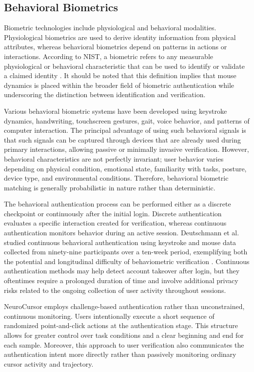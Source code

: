 \documentclass[conference]{IEEEtran}
\begin{document}
\subsection{Behavioral Biometrics}

Biometric technologies include physiological and behavioral modalities. Physiological biometrics are used to derive identity information from physical attributes, whereas behavioral biometrics depend on patterns in actions or interactions. According to NIST, a biometric refers to any measurable physiological or behavioral characteristic that can be used to identify or validate a claimed identity \cite{nistBiometrics}. It should be noted that this definition implies that mouse dynamics is placed within the broader field of biometric authentication while underscoring the distinction between identification and verification. 

Various behavioral biometric systems have been developed using keystroke dynamics, handwriting, touchscreen gestures, gait, voice behavior, and patterns of computer interaction. The principal advantage of using such behavioral signals is that such signals can be captured through devices that are already used during primary interactions, allowing passive or minimally invasive verification. However, behavioral characteristics are not perfectly invariant; user behavior varies depending on physical condition, emotional state, familiarity with tasks, posture, device type, and environmental conditions. Therefore, behavioral biometric matching is generally probabilistic in nature rather than deterministic. 

The behavioral authentication process can be performed either as a discrete checkpoint or continuously after the initial login. Discrete authentication evaluates a specific interaction created for verification, whereas continuous authentication monitors behavior during an active session. Deutschmann et al. studied continuous behavioral authentication using keystroke and mouse data collected from ninety-nine participants over a ten-week period, exemplifying both the potential and longitudinal difficulty of behaviometric verification \cite{deutschmannContinuousAuthentication}. Continuous authentication methods may help detect account takeover after login, but they oftentimes require a prolonged duration of time and involve additional privacy risks related to the ongoing collection of user activity throughout sessions. 

NeuroCursor employs challenge-based authentication rather than unconstrained, continuous monitoring. Users intentionally execute a short sequence of randomized point-and-click actions at the authentication stage. This structure allows for greater control over task conditions and a clear beginning and end for each sample. Moreover, this approach to user verification also communicates the authentication intent more directly rather than passively monitoring ordinary cursor activity and trajectory. 
\end{document}
